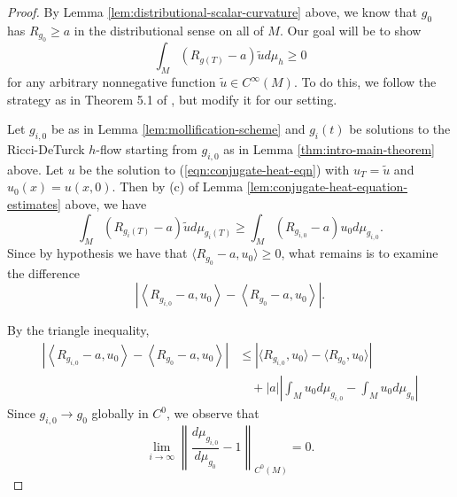 \documentclass[12pt]{amsart}
\theoremstyle{plain}
\theoremstyle{plain}
\theoremstyle{definition}
\theoremstyle{remark}
\numberwithin{equation}{subsection}
\begin{document}
\begin{proof}
    By Lemma \ref{lem:distributional-scalar-curvature} above, we know that $g_0$ has $R_{g_0} \geq a$ in the distributional sense on all of $M$. Our goal will be to show
    \begin{equation*}
        \int_M (R_{g(T)}-a)\tilde{u}d\mu_h \geq 0
    \end{equation*}
    for any arbitrary nonnegative function $\tilde{u}\in C^\infty(M)$. To do this, we follow the strategy as in Theorem 5.1 of \cite{jiang_weak_2021}, but modify it for our setting. 
    
    Let $g_{i,0}$ be as in Lemma \ref{lem:mollification-scheme} and $g_i(t)$ be solutions to the Ricci-DeTurck $h$-flow starting from $g_{i,0}$ as in Lemma \ref{thm:intro-main-theorem} above. Let $u$ be the solution to (\ref{eqn:conjugate-heat-eqn}) with $u_T = \tilde{u}$ and $u_0(x) = u(x,0)$. Then by (c) of Lemma \ref{lem:conjugate-heat-equation-estimates} above, we have
    \begin{equation}\label{eqn:scalar-monotonicity}
        \int_M (R_{g_i(T)}-a)\tilde{u}d\mu_{g_i(T)} \geq \int_M (R_{g_{i,0}}-a)u_0d\mu_{g_{i,0}}.
    \end{equation}
    Since by hypothesis we have that $\langle R_{g_0} - a,u_0\rangle \geq 0$, what remains is to examine the difference
    \begin{equation*}
        \left|\left\langle R_{g_{i,0}}-a, u_0\right\rangle - \left\langle R_{g_0} - a, u_0\right\rangle \right|.
    \end{equation*}

    By the triangle inequality,
    \begin{align*}
        \left|\left\langle R_{g_{i,0}}-a, u_0\right\rangle - \left\langle R_{g_0} - a, u_0\right\rangle \right| &\leq \left|\langle R_{g_{i,0}},u_0\rangle - \langle R_{g_0}, u_0\rangle\right| \nonumber \\
        &\quad + |a|\left|\int_M u_0 d\mu_{g_{i,0}} - \int_M u_0 d\mu_{g_0}\right|
    \end{align*}
    Since $g_{i,0} \to g_0$ globally in $C^0$, we observe that 
    \begin{equation*}
        \lim\limits_{i\to\infty}\left\lVert \frac{d\mu_{g_{i,0}}}{d\mu_{g_0}} - 1\right\rVert_{C^0(M)} = 0.
    \end{equation*}
    \begin{comment}
    One way to see this is to choose local coordinates at a point and diagonalizing to write  $\sqrt{\det((g_{i,0})_{ij})} = \prod\limits_{k=1^n}\tilde{\lambda_k}(x)$, $\sqrt{\det((g_{0})_{ij})} = \prod\limits_{k=1^n}\lambda_k(x)$ where $\tilde{\lambda_k}$ and $\lambda_k$ are the eigenvalues of $g_{i,0}$, $g_0$ respectively at the point $x$. Then observe that $g_{i,0} \to g_0$ in $C^0(M)$ as $i \to \infty$ implies that $\left|\frac{\tilde{\lambda_k}(x)}{\lambda_k(x)} - 1\right| \to 0$ as $i \to \infty$.


\end{comment}
\end{proof}
\end{document}
